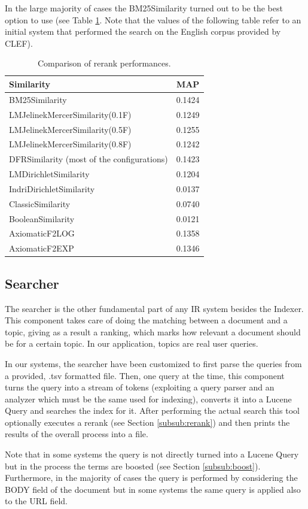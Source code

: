 In the large majority of cases the BM25Similarity turned out to be the best option to use (see Table \ref{tab:similcomp}. Note that the values of the following table refer to an initial system that performed the search on the English corpus provided by CLEF).
\begin{center}
\begin{table}[h!]
\centering
\begin{tabular}{|l|c|} 
 \hline
    \textbf{Similarity} &  \textbf{MAP}  \\
 \hline\hline
 BM25Similarity & 0.1424  \\ 
 LMJelinekMercerSimilarity(0.1F) & 0.1249   \\
 LMJelinekMercerSimilarity(0.5F) & 0.1255  \\
 LMJelinekMercerSimilarity(0.8F) & 0.1242  \\ 
 DFRSimilarity (most of the configurations)& 0.1423\\
 LMDirichletSimilarity & 0.1204\\
 IndriDirichletSimilarity & 0.0137 \\
 ClassicSimilarity & 0.0740\\
 BooleanSimilarity & 0.0121 \\
 AxiomaticF2LOG & 0.1358 \\
 AxiomaticF2EXP & 0.1346\\
 \hline
\end{tabular}
\caption{Comparison of rerank performances.}
\label{tab:similcomp}
\end{table}
\end{center}

\subsection{Searcher}
\label{subsec:searcher}
The searcher is the other fundamental part of any IR system besides the Indexer. This component takes care of doing the matching between a document and a topic, giving as a result a ranking, which marks how relevant a document should be for a certain topic. In our application, topics are real user queries.
\par
In our systems, the searcher have been customized to first parse the queries from a provided, .tsv formatted file. Then, one query at the time, this component turns the query into a stream of tokens (exploiting a query parser and an analyzer which must be the same used for indexing), converts it into a Lucene Query and searches the index for it. After performing the actual search this tool optionally executes a rerank (see Section \ref{subsub:rerank}) and then prints the results of the overall process into a file.
\par
Note that in some systems the query is not directly turned into a Lucene Query but in the process the terms are boosted (see Section \ref{subsub:boost}). Furthermore, in the majority of cases the query is performed by considering the BODY field of the document but in some systems the same query is applied also to the URL field.

